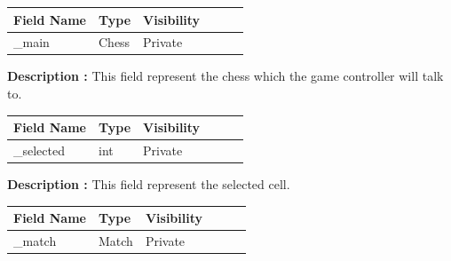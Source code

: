 \documentclass[12pt]{article}
\begin{document}
    \begin{table}[H]
        \begin{tabular}{llllll}
            \hline
            \multicolumn{1}{|l|}{\cellcolor[HTML]{EFEFEF}\textbf{Field Name}} & \multicolumn{1}{l|}{\cellcolor[HTML]{EFEFEF}\textbf{Type}} & \multicolumn{1}{l|}{\cellcolor[HTML]{EFEFEF}\textbf{Visibility}} \\ \hline
            \multicolumn{1}{|l|}{\_main}                                      & \multicolumn{1}{l|}{Chess}                                 & \multicolumn{1}{l|}{Private}                                     \\ \hline
        \end{tabular}
    \end{table}

    \textbf{Description :} This field represent the chess which the game controller will talk to.

    \begin{table}[H]
        \begin{tabular}{llllll}
            \hline
            \multicolumn{1}{|l|}{\cellcolor[HTML]{EFEFEF}\textbf{Field Name}} & \multicolumn{1}{l|}{\cellcolor[HTML]{EFEFEF}\textbf{Type}} & \multicolumn{1}{l|}{\cellcolor[HTML]{EFEFEF}\textbf{Visibility}} \\ \hline
            \multicolumn{1}{|l|}{\_selected}                                  & \multicolumn{1}{l|}{int}                                   & \multicolumn{1}{l|}{Private}                                     \\ \hline
        \end{tabular}
    \end{table}

    \textbf{Description :} This field represent the selected cell.

    \begin{table}[H]
        \begin{tabular}{llllll}
            \hline
            \multicolumn{1}{|l|}{\cellcolor[HTML]{EFEFEF}\textbf{Field Name}} & \multicolumn{1}{l|}{\cellcolor[HTML]{EFEFEF}\textbf{Type}} & \multicolumn{1}{l|}{\cellcolor[HTML]{EFEFEF}\textbf{Visibility}} \\ \hline
            \multicolumn{1}{|l|}{\_match}                                     & \multicolumn{1}{l|}{Match}                                 & \multicolumn{1}{l|}{Private}                                     \\ \hline
        \end{tabular}
    \end{table}
\end{document}
